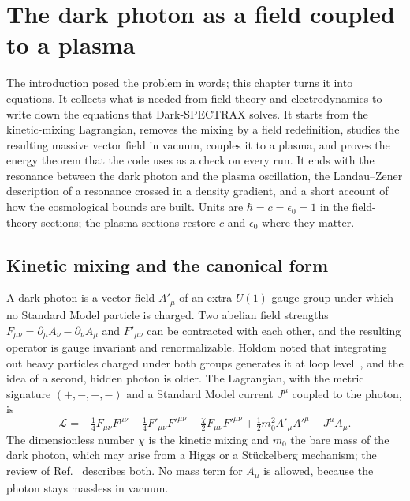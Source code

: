 \chapter{The dark photon as a field coupled to a plasma}\label{ch:darkphoton}

The introduction posed the problem in words; this chapter turns it into equations. It collects what is needed from field theory and electrodynamics to write down the equations that Dark-SPECTRAX solves. It starts from the kinetic-mixing Lagrangian, removes the mixing by a field redefinition, studies the resulting massive vector field in vacuum, couples it to a plasma, and proves the energy theorem that the code uses as a check on every run. It ends with the resonance between the dark photon and the plasma oscillation, the Landau--Zener description of a resonance crossed in a density gradient, and a short account of how the cosmological bounds are built. Units are $\hbar=c=\epsilon_0=1$ in the field-theory sections; the plasma sections restore $c$ and $\epsilon_0$ where they matter.

\section{Kinetic mixing and the canonical form}\label{sec:mixing}

A dark photon is a vector field $A'_\mu$ of an extra $U(1)$ gauge group under which no Standard Model particle is charged. Two abelian field strengths $F_{\mu\nu}=\partial_\mu A_\nu-\partial_\nu A_\mu$ and $F'_{\mu\nu}$ can be contracted with each other, and the resulting operator is gauge invariant and renormalizable. Holdom noted that integrating out heavy particles charged under both groups generates it at loop level~\citep{Holdom1986}, and the idea of a second, hidden photon is older. The Lagrangian, with the metric signature $(+,-,-,-)$ and a Standard Model current $J^\mu$ coupled to the photon, is
\begin{equation}
\mathcal L=-\tfrac14F_{\mu\nu}F^{\mu\nu}-\tfrac14F'_{\mu\nu}F'^{\mu\nu}-\tfrac{\chi}{2}F_{\mu\nu}F'^{\mu\nu}+\tfrac12m_0^2A'_\mu A'^\mu-J^\mu A_\mu .
\label{eq:Lmix}
\end{equation}
The dimensionless number $\chi$ is the kinetic mixing and $m_0$ the bare mass of the dark photon, which may arise from a Higgs or a St\"uckelberg mechanism; the review of Ref.~\citep{Fabbrichesi2020} describes both. No mass term for $A_\mu$ is allowed, because the photon stays massless in vacuum.


